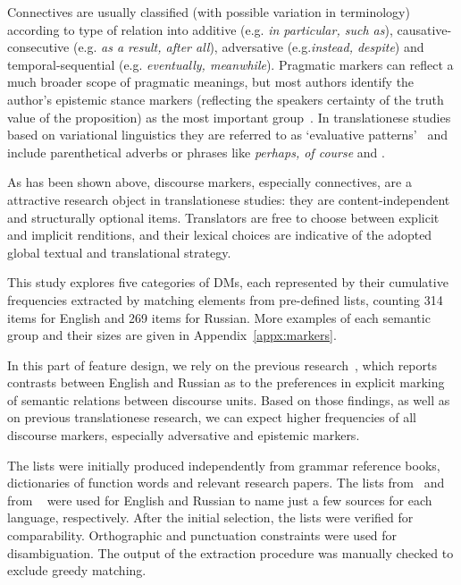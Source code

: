 Connectives are usually classified (with possible variation in terminology) according to type of relation into additive (e.g. \textit{in particular, such as}), causative-consecutive (e.g. \textit{as a result, after all}), adversative (e.g.\textit{instead, despite}) and temporal-sequential (e.g. \textit{eventually, meanwhile}). 
Pragmatic markers can reflect a much broader scope of pragmatic meanings, but most authors identify the author's epistemic stance markers (reflecting the speakers certainty of the truth value of the proposition) as the most important group~\cite[see][]{Fraser2006,Halliday1989,Biber1999}. In translationese studies based on variational linguistics they are referred to as `evaluative patterns'~\cite{Lapshinova2017} and include parenthetical adverbs or phrases like \textit{perhaps, of course} and .

As has been shown above, discourse markers, especially connectives, are a attractive research object in translationese studies: they are content-independent and structurally optional items. Translators are free to choose between explicit and implicit renditions, and their lexical choices are indicative of the adopted global textual and translational strategy.

This study explores five categories of DMs, each represented by their cumulative frequencies extracted by matching elements from pre-defined lists, counting 314 items for English and 269 items for Russian. More examples of each semantic group and their sizes are given in Appendix~\ref{appx:markers}.

In this part of feature design, we rely on the previous research~\cite{Kunilovskaya2017conn}, which reports contrasts between English and Russian as to the preferences in explicit marking of semantic relations between discourse units. Based on those findings, as well as on previous translationese research, we can expect higher frequencies of all discourse markers, especially adversative and epistemic markers.

The lists were initially produced independently from grammar reference books, dictionaries of function words and relevant research papers. The lists from~\citet{Biber1999,Fraser2006,Liu2008} and from ~\citet{Shvedova1980,Priyatkina2001,Novikova2008} were used for English and Russian to name just a few sources for each language, respectively. After the initial selection, the lists were verified for comparability. Orthographic and punctuation constraints were used for disambiguation. The output of the extraction procedure was manually checked to exclude greedy matching.

